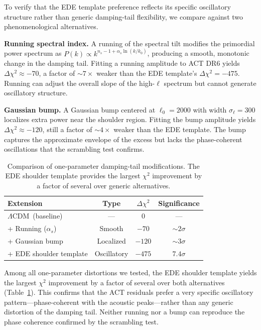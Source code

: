 \documentclass[twocolumn,showpacs,preprintnumbers,amsmath,amssymb,prd]{revtex4-2}
\newcommand{\lcdm}{$\Lambda$CDM}
\begin{document}
To verify that the EDE template preference reflects its specific oscillatory 
structure rather than generic damping-tail flexibility, we compare against 
two phenomenological alternatives.

\textbf{Running spectral index.} A running of the spectral tilt modifies 
the primordial power spectrum as $P(k) \propto k^{n_s - 1 + \alpha_s \ln(k/k_0)}$, 
producing a smooth, monotonic change in the damping tail. Fitting a running 
amplitude to ACT DR6 yields $\Delta\chi^2 \approx -70$, a factor of 
$\sim 7\times$ weaker than the EDE template's $\Delta\chi^2 = -475$. Running 
can adjust the overall slope of the high-$\ell$ spectrum but cannot generate 
oscillatory structure.

\textbf{Gaussian bump.} A Gaussian bump centered at $\ell_0 = 2000$ with 
width $\sigma_\ell = 300$ localizes extra power near the shoulder region. 
Fitting the bump amplitude yields $\Delta\chi^2 \approx -120$, still a factor 
of $\sim 4\times$ weaker than the EDE template. The bump captures the 
approximate envelope of the excess but lacks the phase-coherent oscillations 
that the scrambling test confirms.

\begin{table}[h]
\centering
\caption{Comparison of one-parameter damping-tail modifications. The EDE 
shoulder template provides the largest $\chi^2$ improvement by a factor of 
several over generic alternatives.}
\begin{tabular}{lccc}
\toprule
Extension & Type & $\Delta\chi^2$ & Significance \\
\midrule
\lcdm\ (baseline) & --- & 0 & --- \\
+ Running ($\alpha_s$) & Smooth & $-70$ & $\sim 2\sigma$ \\
+ Gaussian bump & Localized & $-120$ & $\sim 3\sigma$ \\
+ EDE shoulder template & Oscillatory & $-475$ & $7.4\sigma$ \\
\bottomrule
\end{tabular}
\label{tab:alternatives}
\end{table}

Among all one-parameter distortions we tested, the EDE shoulder template 
yields the largest $\chi^2$ improvement by a factor of several over both 
alternatives (Table~\ref{tab:alternatives}). This confirms that the ACT 
residuals prefer a very specific oscillatory pattern---phase-coherent with 
the acoustic peaks---rather than any generic distortion of the damping tail. 
Neither running nor a bump can reproduce the phase coherence 
confirmed by the scrambling test.
\end{document}
